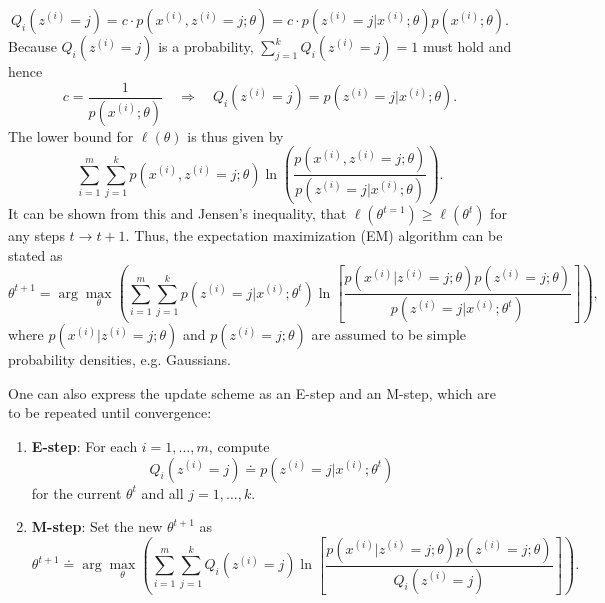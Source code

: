 \documentclass[a4paper,11pt]{article}
\numberwithin{equation}{section}
\begin{document}
{\begin{equation}
Q_i(z^{(i)}=j) = c\cdot p(x^{(i)},z^{(i)}=j;\theta) = c\cdot p(z^{(i)}=j|x^{(i)};\theta)p(x^{(i)};\theta).
\end{equation} Because $Q_i(z^{(i)}=j)$ is a probability, $\sum_{j=1}^kQ_i(z^{(i)}=j) = 1$ must hold and hence \begin{equation}
c = \frac{1}{p(x^{(i)};\theta)} \quad \Rightarrow\quad Q_i(z^{(i)}=j) = p(z^{(i)}=j|x^{(i)};\theta).
\end{equation} The lower bound for $\ell(\theta)$ is thus given by \begin{equation}
\sum_{i=1}^{m}\sum_{j=1}^{k}p(x^{(i)},z^{(i)}=j;\theta)\ln\left( \frac{p(x^{(i)},z^{(i)}=j;\theta)}{p(z^{(i)}=j|x^{(i)};\theta)}\right).
\end{equation} It can be shown from this and Jensen's inequality, that $\ell(\theta^{t=1}) \geq \ell(\theta^t)$ for any steps $t \rightarrow t+1$. Thus, the expectation maximization (EM) algorithm can be stated as \begin{equation}
\theta^{t+1} = \arg\max_\theta\left(\sum_{i=1}^m\sum_{j=1}^k p(z^{(i)}=j|x^{(i)};\theta^t)\ln\left[\frac{p(x^{(i)}|z^{(i)}=j;\theta)p(z^{(i)}=j;\theta)}{p(z^{(i)}=j|x^{(i)};\theta^t)}\right]
\right),
\end{equation} where $p(x^{(i)}|z^{(i)}=j;\theta)$ and $p(z^{(i)}=j;\theta)$ are assumed to be simple probability densities, e.g. Gaussians.

One can also express the update scheme as an E-step and an M-step, which are to be repeated until convergence:
\begin{enumerate}
	\item \textbf{E-step}: For each $i=1,\dots,m$, compute \begin{equation}
		Q_i(z^{(i)}=j) \doteq p(z^{(i)}=j|x^{(i)};\theta^t)
	\end{equation} for the current $\theta^t$ and all $j=1,\dots,k$.
	\item \textbf{M-step}: Set the new $\theta^{t+1}$ as \begin{equation}
		\theta^{t+1} \doteq \arg\max_\theta\left(\sum_{i=1}^{m}\sum_{j=1}^{k}Q_i(z^{(i)}=j)\ln\left[\frac{p(x^{(i)}|z^{(i)}=j;\theta)p(z^{(i)}=j;\theta)}{Q_i(z^{(i)}=j)}\right]\right).
	\end{equation}
\end{enumerate}
}
\end{document}
